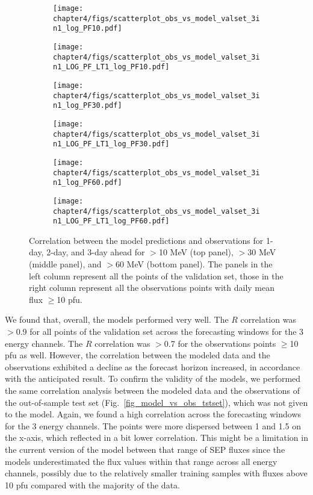 \begin{figure}[htp]
    \centering
    \begin{subfigure}
         \centering
         \texttt{[image: chapter4/figs/scatterplot\_obs\_vs\_model\_valset\_3in1\_log\_PF10.pdf]}
    \end{subfigure}
    \begin{subfigure}
         \centering
         \texttt{[image: chapter4/figs/scatterplot\_obs\_vs\_model\_valset\_3in1\_LOG\_PF\_LT1\_log\_PF10.pdf]}
    \end{subfigure}
    \begin{subfigure}
         \centering
         \texttt{[image: chapter4/figs/scatterplot\_obs\_vs\_model\_valset\_3in1\_log\_PF30.pdf]}
    \end{subfigure}
    \begin{subfigure}
         \centering
         \texttt{[image: chapter4/figs/scatterplot\_obs\_vs\_model\_valset\_3in1\_LOG\_PF\_LT1\_log\_PF30.pdf]}
    \end{subfigure}
    \begin{subfigure}
         \centering
         \texttt{[image: chapter4/figs/scatterplot\_obs\_vs\_model\_valset\_3in1\_log\_PF60.pdf]}
    \end{subfigure}
    \begin{subfigure}
         \centering
         \texttt{[image: chapter4/figs/scatterplot\_obs\_vs\_model\_valset\_3in1\_LOG\_PF\_LT1\_log\_PF60.pdf]}
    \end{subfigure}
\caption{Correlation between the model predictions and observations for 1-day, 2-day, and 3-day ahead for $>$10 MeV (top panel), $>$30 MeV (middle panel), and $>$60 MeV (bottom panel). The panels in the left column represent all the points of the validation set, those in the right column represent all the observations points with daily mean flux $\geq$10 pfu.}
\label{fig_model_vs_obs_valset}
\end{figure}

We found that, overall, the models performed very well. The $R$ correlation was $>$0.9 for all points of the validation set across the forecasting windows for the 3 energy channels. The $R$ correlation was $>$0.7 for the observations points $\geq$10 pfu as well. However, the correlation between the modeled data and the observations exhibited a decline as the forecast horizon increased, in accordance with the anticipated result.
To confirm the validity of the models, we performed the same correlation analysis between the modeled data and the observations of the out-of-sample test set (Fig.~\ref{fig_model_vs_obs_tstset}), which was not given to the model. Again, we found a high correlation across the forecasting windows for the 3 energy channels. 
The points were more dispersed between 1 and 1.5 on the x-axis, which reflected in a bit lower correlation. This might be a limitation in the current version of the model between that range of SEP fluxes since the models underestimated the flux values within that range across all energy channels, possibly due to the relatively smaller training samples with fluxes above 10 pfu compared with the majority of the data.


